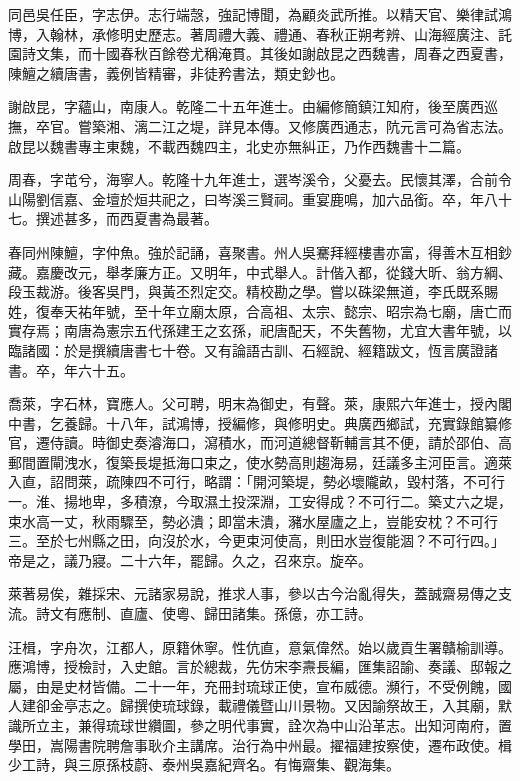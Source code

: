 \begin{pinyinscope}
同邑吳任臣，字志伊。志行端愨，強記博聞，為顧炎武所推。以精天官、樂律試鴻博，入翰林，承修明史歷志。著周禮大義、禮通、春秋正朔考辨、山海經廣注、託園詩文集，而十國春秋百餘卷尤稱淹貫。其後如謝啟昆之西魏書，周春之西夏書，陳鱣之續唐書，義例皆精審，非徒矜書法，類史鈔也。

謝啟昆，字蘊山，南康人。乾隆二十五年進士。由編修簡鎮江知府，後至廣西巡撫，卒官。嘗築湘、漓二江之堤，詳見本傳。又修廣西通志，阬元言可為省志法。啟昆以魏書專主東魏，不載西魏四主，北史亦無糾正，乃作西魏書十二篇。

周春，字芚兮，海寧人。乾隆十九年進士，選岑溪令，父憂去。民懷其澤，合前令山陽劉信嘉、金壇於烜共祀之，曰岑溪三賢祠。重宴鹿鳴，加六品銜。卒，年八十七。撰述甚多，而西夏書為最著。

春同州陳鱣，字仲魚。強於記誦，喜聚書。州人吳騫拜經樓書亦富，得善木互相鈔藏。嘉慶改元，舉孝廉方正。又明年，中式舉人。計偕入都，從錢大昕、翁方綱、段玉裁游。後客吳門，與黃丕烈定交。精校勘之學。嘗以硃梁無道，李氏既系賜姓，復奉天祐年號，至十年立廟太原，合高祖、太宗、懿宗、昭宗為七廟，唐亡而實存焉；南唐為憲宗五代孫建王之玄孫，祀唐配天，不失舊物，尤宜大書年號，以臨諸國：於是撰續唐書七十卷。又有論語古訓、石經說、經籍跋文，恆言廣證諸書。卒，年六十五。

喬萊，字石林，寶應人。父可聘，明末為御史，有聲。萊，康熙六年進士，授內閣中書，乞養歸。十八年，試鴻博，授編修，與修明史。典廣西鄉試，充實錄館纂修官，遷侍讀。時御史奏濬海口，瀉積水，而河道總督靳輔言其不便，請於邵伯、高郵間置閘洩水，復築長堤抵海口束之，使水勢高則趨海易，廷議多主河臣言。適萊入直，詔問萊，疏陳四不可行，略謂：「開河築堤，勢必壞隴畝，毀村落，不可行一。淮、揚地卑，多積潦，今取濕土投深淵，工安得成？不可行二。築丈六之堤，束水高一丈，秋雨驟至，勢必潰；即當未潰，瀦水屋廬之上，豈能安枕？不可行三。至於七州縣之田，向沒於水，今更束河使高，則田水豈復能涸？不可行四。」帝是之，議乃寢。二十六年，罷歸。久之，召來京。旋卒。

萊著易俟，雜採宋、元諸家易說，推求人事，參以古今治亂得失，蓋誠齋易傳之支流。詩文有應制、直廬、使粵、歸田諸集。孫億，亦工詩。

汪楫，字舟次，江都人，原籍休寧。性伉直，意氣偉然。始以歲貢生署贛榆訓導。應鴻博，授檢討，入史館。言於總裁，先仿宋李燾長編，匯集詔諭、奏議、邸報之屬，由是史材皆備。二十一年，充冊封琉球正使，宣布威德。瀕行，不受例餽，國人建卻金亭志之。歸撰使琉球錄，載禮儀暨山川景物。又因諭祭故王，入其廟，默識所立主，兼得琉球世纘圖，參之明代事實，詮次為中山沿革志。出知河南府，置學田，嵩陽書院聘詹事耿介主講席。治行為中州最。擢福建按察使，遷布政使。楫少工詩，與三原孫枝蔚、泰州吳嘉紀齊名。有悔齋集、觀海集。


\end{pinyinscope}
